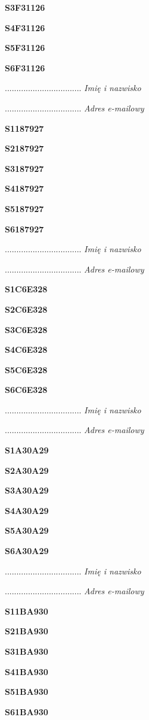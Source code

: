 \Large \textbf{S3F31126}

\Large \textbf{S4F31126}

\Large \textbf{S5F31126}

\Large \textbf{S6F31126}

.................................
\textit{Imię i nazwisko}

.................................
\textit{Adres e-mailowy}

\Large \textbf{S1187927}

\Large \textbf{S2187927}

\Large \textbf{S3187927}

\Large \textbf{S4187927}

\Large \textbf{S5187927}

\Large \textbf{S6187927}

.................................
\textit{Imię i nazwisko}

.................................
\textit{Adres e-mailowy}

\Large \textbf{S1C6E328}

\Large \textbf{S2C6E328}

\Large \textbf{S3C6E328}

\Large \textbf{S4C6E328}

\Large \textbf{S5C6E328}

\Large \textbf{S6C6E328}

.................................
\textit{Imię i nazwisko}

.................................
\textit{Adres e-mailowy}

\Large \textbf{S1A30A29}

\Large \textbf{S2A30A29}

\Large \textbf{S3A30A29}

\Large \textbf{S4A30A29}

\Large \textbf{S5A30A29}

\Large \textbf{S6A30A29}

.................................
\textit{Imię i nazwisko}

.................................
\textit{Adres e-mailowy}

\Large \textbf{S11BA930}

\Large \textbf{S21BA930}

\Large \textbf{S31BA930}

\Large \textbf{S41BA930}

\Large \textbf{S51BA930}

\Large \textbf{S61BA930}

